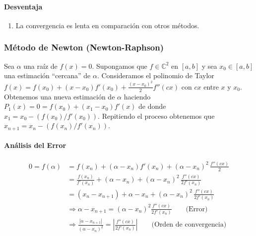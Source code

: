 \hypertarget{desventaja}{%
\paragraph{Desventaja}\label{desventaja}}

\begin{enumerate}
\def\labelenumi{\arabic{enumi}.}
\tightlist
\item
  La convergencia es lenta en comparación con otros métodos.
\end{enumerate}

\hypertarget{muxe9todo-de-newton-newton-raphson}{%
\subsubsection{Método de Newton
(Newton-Raphson)}\label{muxe9todo-de-newton-newton-raphson}}

Sea \(\alpha\) una raíz de \(f(x) = 0\). Supongamos que
\(f \in \mathbb{C}^2\) en \([a,b]\) y sea \(x_0 \in [a,b]\) una
estimación ``cercana'' de \(\alpha\). Consideramos el polinomio de
Taylor
\(f(x) = f(x_0) + (x - x_0)f'(x_0) + \frac{(x - x_0)^2}{2}f''(cx)\) con
\(cx\) entre \(x\) y \(x_0\). Obtenemos una nueva estimación de
\(\alpha\) haciendo \(P_1(x) = 0 = f(x_0) + (x_1 - x_0)f'(x)\) de donde
\(x_1 = x_0 - (f(x_0) / f'(x_0))\). Repitiendo el proceso obtenemos que
\(x_{n+1} = x_n - (f(x_n) / f'(x_n))\).

\hypertarget{anuxe1lisis-del-error}{%
\paragraph{Análisis del Error}\label{anuxe1lisis-del-error}}

\begin{align*}
0 = f(\alpha) 
&= f(x_n) + (\alpha - x_n)f'(x_n) + (\alpha - x_n)^2 \,\frac{f''(cx)}{2} \\
&= \frac{f(x_n)}{f'(x_n)} + (\alpha - x_n) 
+ (\alpha - x_n)^2 \,\frac{f''(cx)}{2f'(x_n)}\\
&= (x_n - x_{n+1}) + \alpha - x_n + (\alpha - x_n)^2 \,\frac{f''(cx)}{2f'(x_n)}\\
&\Rightarrow \alpha - x_{n+1} = (\alpha - x_n)^2 \frac{f''(cx)}{2f'(x_n)} 
\qquad \text{(Error)} \\
&\Rightarrow \frac{|\alpha - x_{n+1}|}{(\alpha - x_n)^2} 
=  \left|\frac{f''(cx)}{2f'(x_n)}\right|
\qquad \text{(Orden de convergencia)} \\
\end{align*}

